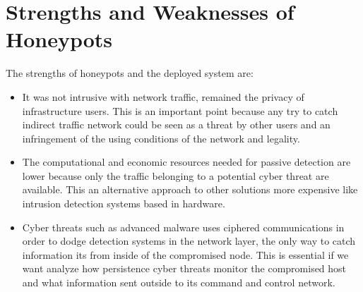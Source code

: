 \documentclass[a4paper]{llncs}
\begin{document}
\section{Strengths and Weaknesses of Honeypots}
\label{sec:Strengths&Weaknesses}
The strengths of honeypots and the deployed system are:
\begin{itemize}
	\item It was not intrusive with network traffic, remained the privacy of infrastructure users. This is an important point because any try to catch indirect traffic network could be seen as a threat by other users and an infringement of the using conditions of the network and legality.
	\item The computational and economic resources needed for passive detection are lower because only the traffic belonging to a potential cyber threat are available. This an alternative approach to other solutions more expensive like intrusion detection systems based in hardware.
	\item Cyber threats such as advanced malware uses ciphered communications in order to dodge detection systems in the network layer, the only way to catch information its from inside of the compromised node. This is essential if we want analyze how persistence cyber threats monitor the compromised host and what information sent outside to its command and control network.
\end{itemize}
\end{document}

